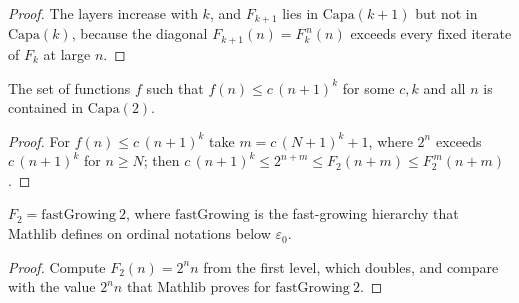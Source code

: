 \begin{proof}
  \leanok
  The layers increase with $k$, and $F_{k+1}$ lies in $\mathrm{Capa}(k+1)$ but not in $\mathrm{Capa}(k)$, because the
  diagonal $F_{k+1}(n) = F_k^{\,n}(n)$ exceeds every fixed iterate of $F_k$ at large $n$.
\end{proof}

\begin{theorem}
  \label{thm:infinite-pol-sub-capa-dos}
  \leanok
  The set of functions $f$ such that $f(n) \le c\,(n+1)^k$ for some $c, k$ and all $n$ is contained in
  $\mathrm{Capa}(2)$.
\end{theorem}

\begin{proof}
  \leanok
  For $f(n) \le c\,(n+1)^k$ take $m = c\,(N+1)^k + 1$, where $2^n$ exceeds $c\,(n+1)^k$ for $n \ge N$; then
  $c\,(n+1)^k \le 2^{n+m} \le F_2(n+m) \le F_2^{\,m}(n+m)$.
\end{proof}

\begin{theorem}
  \label{thm:infinite-F-fastgrowing-two}
  \leanok
  $F_2 = \mathrm{fastGrowing}\ 2$, where $\mathrm{fastGrowing}$ is the fast-growing hierarchy that Mathlib defines on
  ordinal notations below $\varepsilon_0$.
\end{theorem}

\begin{proof}
  \leanok
  Compute $F_2(n) = 2^n n$ from the first level, which doubles, and compare with the value $2^n n$ that Mathlib
  proves for $\mathrm{fastGrowing}\ 2$.
\end{proof}
